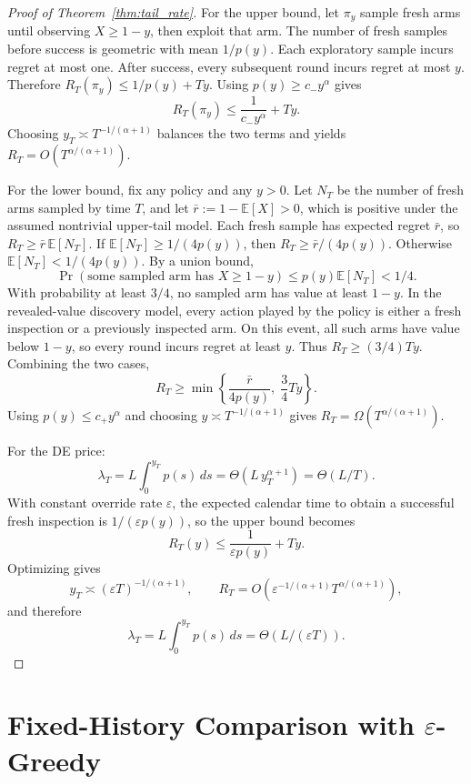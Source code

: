 \documentclass{article}
\newcommand{\E}{\mathbb{E}}
\begin{document}
\begin{proof}[Proof of Theorem~\ref{thm:tail_rate}]
For the upper bound, let $\pi_y$ sample fresh arms until observing $X\ge 1-y$, then exploit that arm.
The number of fresh samples before success is geometric with mean $1/p(y)$.
Each exploratory sample incurs regret at most one.
After success, every subsequent round incurs regret at most $y$.
Therefore $R_T(\pi_y)\le 1/p(y)+Ty$.
Using $p(y)\ge c_-y^\alpha$ gives
\[
  R_T(\pi_y)
  \le
  \frac{1}{c_-y^\alpha}+Ty.
\]
Choosing $y_T\asymp T^{-1/(\alpha+1)}$ balances the two terms and yields $R_T=O(T^{\alpha/(\alpha+1)})$.

For the lower bound, fix any policy and any $y>0$.
Let $N_T$ be the number of fresh arms sampled by time $T$, and let $\bar{r}:=1-\E[X]>0$, which is positive under the assumed nontrivial upper-tail model.
Each fresh sample has expected regret $\bar{r}$, so $R_T\ge \bar{r}\,\E[N_T]$.
If $\E[N_T]\ge 1/(4p(y))$, then $R_T\ge \bar{r}/(4p(y))$.
Otherwise $\E[N_T]<1/(4p(y))$.
By a union bound,
\[
  \Pr(\text{some sampled arm has }X\ge 1-y)
  \le p(y)\E[N_T] < 1/4.
\]
With probability at least $3/4$, no sampled arm has value at least $1-y$.
In the revealed-value discovery model, every action played by the policy is either a fresh inspection or a previously inspected arm.
On this event, all such arms have value below $1-y$, so every round incurs regret at least $y$.
Thus $R_T\ge (3/4)Ty$.
Combining the two cases,
\[
  R_T
  \ge
  \min\left\{
    \frac{\bar{r}}{4p(y)},\;
    \frac{3}{4}Ty
  \right\}.
\]
Using $p(y)\le c_+y^\alpha$ and choosing $y\asymp T^{-1/(\alpha+1)}$ gives $R_T=\Omega(T^{\alpha/(\alpha+1)})$.

For the DE price:
\[
  \lambda_T
  =
  L\int_0^{y_T}p(s)\,ds
  =
  \Theta(L\,y_T^{\alpha+1})
  =
  \Theta(L/T).
\]
With constant override rate $\varepsilon$, the expected calendar time to obtain a successful fresh inspection is $1/(\varepsilon p(y))$, so the upper bound becomes
\[
  R_T(y)\le \frac{1}{\varepsilon p(y)}+Ty.
\]
Optimizing gives
\[
  y_T\asymp(\varepsilon T)^{-1/(\alpha+1)},
  \qquad
  R_T=O\!\left(\varepsilon^{-1/(\alpha+1)}T^{\alpha/(\alpha+1)}\right),
\]
and therefore
\[
  \lambda_T
  =
  L\int_0^{y_T}p(s)\,ds
  =
  \Theta(L/(\varepsilon T)).
\]

\end{proof}


\section{Fixed-History Comparison with $\varepsilon$-Greedy}
\label{app:fixed_history}
\end{document}
